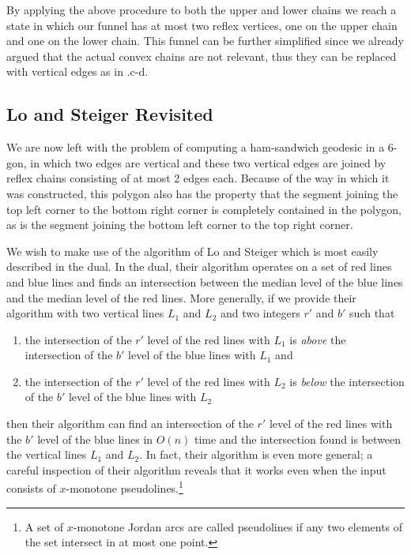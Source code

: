 \documentclass[charterfonts,lotsofwhite]{patmorin}
\begin{document}
By applying the above procedure to both the upper and lower chains
we reach a state in which our funnel has at most two reflex vertices, one
on the upper chain and one on the lower chain.  This funnel can be
further simplified since we already argued that the actual convex
chains are not relevant, thus they can be replaced with vertical
edges as in .c-d.

\subsection{Lo and Steiger Revisited}

We are now left with the problem of computing a ham-sandwich geodesic
in a 6-gon, in which two edges are vertical and these two vertical edges
are joined by reflex chains consisting of at most 2 edges each.
Because of the way in which it was constructed, this polygon also has
the property that the segment joining the top left corner to the
bottom right corner is completely contained in the polygon, as is the
segment joining the bottom left corner to the top right corner.

We wish to make use of the algorithm of Lo and Steiger
\cite{ls90} which is most easily described in the dual.  In the dual,
their algorithm operates on a set of red lines and blue lines and
finds an intersection between the median level of the blue lines and
the median level of the red lines.  More generally, if we provide
their algorithm with two vertical lines $L_1$ and $L_2$ and two
integers $r'$ and $b'$ such that 
\begin{enumerate}

\item the intersection of the $r'$ level of the red lines with $L_1$
is \emph{above} the intersection of the $b'$ level of the blue lines
with $L_1$ and

\item the intersection of the $r'$ level of the red lines with $L_2$
is \emph{below} the intersection of the $b'$ level of the blue lines
with $L_2$ 

\end{enumerate}
then their algorithm can find an intersection of the $r'$ level of the
red lines with the $b'$ level of the blue lines in $O(n)$ time and the
intersection found is between the vertical lines $L_1$ and $L_2$.  In
fact, their algorithm is even more general;  a careful inspection of
their algorithm reveals that it works even when the input consists of
$x$-monotone pseudolines.\footnote{A set of $x$-monotone Jordan arcs
are called pseudolines if any two elements of the set intersect in at
most one point.}
\end{document}

